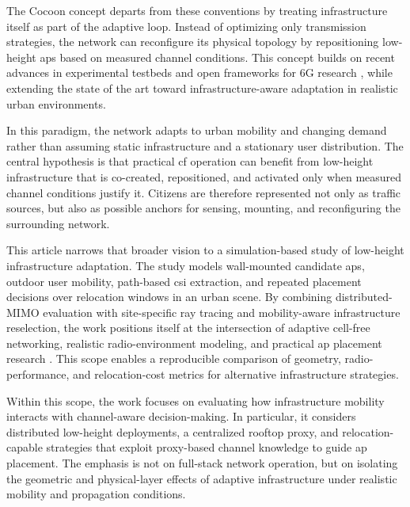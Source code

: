 The Cocoon concept departs from these conventions by treating infrastructure itself as part of the adaptive loop. Instead of optimizing only transmission strategies, the network can reconfigure its physical topology by repositioning low-height \glspl{ap} based on measured channel conditions. This concept builds on recent advances in experimental testbeds and open frameworks for 6G research \cite{9815696,simulator,Call2311:Open}, while extending the state of the art toward infrastructure-aware adaptation in realistic urban environments.

In this paradigm, the network adapts to urban mobility and changing demand rather than assuming static infrastructure and a stationary user distribution. The central hypothesis is that practical \gls{cf} operation can benefit from low-height infrastructure that is co-created, repositioned, and activated only when measured channel conditions justify it. Citizens are therefore represented not only as traffic sources, but also as possible anchors for sensing, mounting, and reconfiguring the surrounding network.

This article narrows that broader vision to a simulation-based study of low-height infrastructure adaptation. The study models wall-mounted candidate \glspl{ap}, outdoor user mobility, path-based \gls{csi} extraction, and repeated placement decisions over relocation windows in an urban scene. By combining distributed-MIMO evaluation with site-specific ray tracing and mobility-aware infrastructure reselection, the work positions itself at the intersection of adaptive cell-free networking, realistic radio-environment modeling, and practical \gls{ap} placement research \cite{zheng2024mobilecfmimo,sionna_rt_2023,zhu2022applacement}. This scope enables a reproducible comparison of geometry, radio-performance, and relocation-cost metrics for alternative infrastructure strategies.


Within this scope, the work focuses on evaluating how infrastructure mobility interacts with channel-aware decision-making. In particular, it considers distributed low-height deployments, a centralized rooftop proxy, and relocation-capable strategies that exploit proxy-based channel knowledge to guide \gls{ap} placement. The emphasis is not on full-stack network operation, but on isolating the geometric and physical-layer effects of adaptive infrastructure under realistic mobility and propagation conditions.

